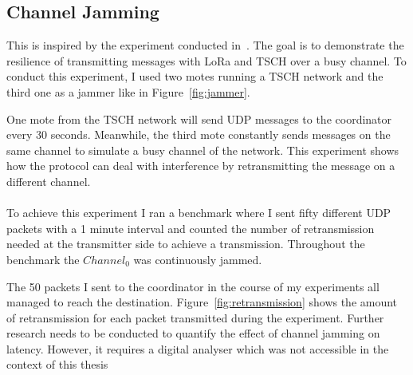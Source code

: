 \subsection{Channel Jamming\label{section:jamming}}

This is inspired by the experiment conducted in~\cite{tschoverlora}.
The goal is to demonstrate the resilience of transmitting messages with LoRa and
TSCH over a busy channel.
To conduct this experiment, I used two motes running a TSCH network and the third one
as a jammer like in Figure~\ref{fig:jammer}.



One mote from the TSCH network will send UDP messages to the coordinator
every 30 seconds.
Meanwhile, the third mote constantly sends messages on the same channel to
simulate a busy channel of the network.
This experiment shows how the protocol can deal with interference by retransmitting
the message on a different channel.

\paragraph{}

To achieve this experiment I ran a benchmark where I sent fifty different UDP packets
with a 1 minute interval and counted the number of retransmission needed at
the transmitter side to achieve a transmission.
Throughout the benchmark the $Channel_0$ was continuously jammed.

The 50 packets I sent to the coordinator in the course of my experiments
all managed to reach the destination.
Figure~\ref{fig:retransmission} shows the amount of retransmission for each
packet transmitted during the experiment.
Further research needs to be conducted to quantify the effect of channel
jamming on latency. However, it requires a digital analyser which was not
accessible in the context of this thesis

